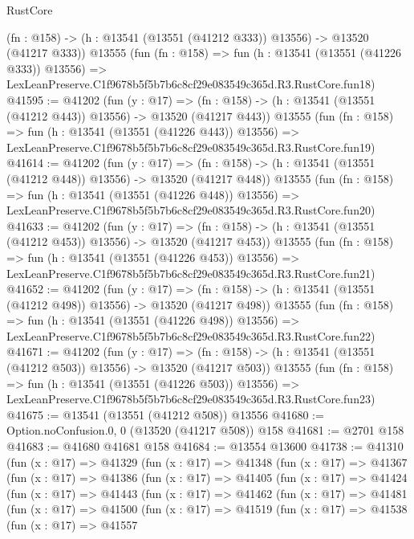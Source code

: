\begin{lexlean}{RustCore}
\begin{coremodule}
    (fn : @158) -> (h : @13541 (@13551 (@41212 @333)) @13556) -> @13520 (@41217 @333))
    @13555
    (fun (fn : @158) =>
    fun (h : @13541 (@13551 (@41226 @333)) @13556) =>
    LexLeanPreserve.C1f9678b5f5b7b6c8cf29e083549c365d.R3.RustCore.fun18)
@41595 := @41202
    (fun (y : @17) =>
    (fn : @158) -> (h : @13541 (@13551 (@41212 @443)) @13556) -> @13520 (@41217 @443))
    @13555
    (fun (fn : @158) =>
    fun (h : @13541 (@13551 (@41226 @443)) @13556) =>
    LexLeanPreserve.C1f9678b5f5b7b6c8cf29e083549c365d.R3.RustCore.fun19)
@41614 := @41202
    (fun (y : @17) =>
    (fn : @158) -> (h : @13541 (@13551 (@41212 @448)) @13556) -> @13520 (@41217 @448))
    @13555
    (fun (fn : @158) =>
    fun (h : @13541 (@13551 (@41226 @448)) @13556) =>
    LexLeanPreserve.C1f9678b5f5b7b6c8cf29e083549c365d.R3.RustCore.fun20)
@41633 := @41202
    (fun (y : @17) =>
    (fn : @158) -> (h : @13541 (@13551 (@41212 @453)) @13556) -> @13520 (@41217 @453))
    @13555
    (fun (fn : @158) =>
    fun (h : @13541 (@13551 (@41226 @453)) @13556) =>
    LexLeanPreserve.C1f9678b5f5b7b6c8cf29e083549c365d.R3.RustCore.fun21)
@41652 := @41202
    (fun (y : @17) =>
    (fn : @158) -> (h : @13541 (@13551 (@41212 @498)) @13556) -> @13520 (@41217 @498))
    @13555
    (fun (fn : @158) =>
    fun (h : @13541 (@13551 (@41226 @498)) @13556) =>
    LexLeanPreserve.C1f9678b5f5b7b6c8cf29e083549c365d.R3.RustCore.fun22)
@41671 := @41202
    (fun (y : @17) =>
    (fn : @158) -> (h : @13541 (@13551 (@41212 @503)) @13556) -> @13520 (@41217 @503))
    @13555
    (fun (fn : @158) =>
    fun (h : @13541 (@13551 (@41226 @503)) @13556) =>
    LexLeanPreserve.C1f9678b5f5b7b6c8cf29e083549c365d.R3.RustCore.fun23)
@41675 := @13541 (@13551 (@41212 @508)) @13556
@41680 := Option.noConfusion.{0, 0} (@13520 (@41217 @508)) @158
@41681 := @2701 @158
@41683 := @41680 @41681 @158
@41684 := @13554 @13600
@41738 := @41310
    (fun (x : @17) =>
    @41329
      (fun (x : @17) =>
      @41348
        (fun (x : @17) =>
        @41367
          (fun (x : @17) =>
          @41386
            (fun (x : @17) =>
            @41405
              (fun (x : @17) =>
              @41424
                (fun (x : @17) =>
                @41443
                  (fun (x : @17) =>
                  @41462
                    (fun (x : @17) =>
                    @41481
                      (fun (x : @17) =>
                      @41500
                        (fun (x : @17) =>
                        @41519
                          (fun (x : @17) =>
                          @41538
                            (fun (x : @17) =>
                            @41557

\end{coremodule}
\end{lexlean}
